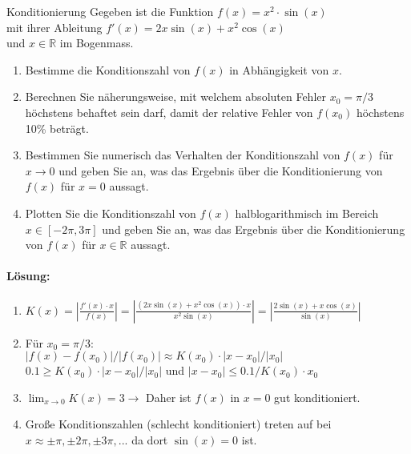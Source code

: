 \begin{example2}{Konditionierung}
Gegeben ist die Funktion
$f(x) = x^2 \cdot \sin(x)$\\
mit ihrer Ableitung
$f'(x) = 2x\sin(x) + x^2\cos(x)$\\
und $x \in \mathbb{R}$ im Bogenmass.
\begin{enumerate}
    \item Bestimme die Konditionszahl von $f(x)$ in Abhängigkeit von $x$.
    \item Berechnen Sie näherungsweise, mit welchem absoluten Fehler $x_0 = \pi/3$ höchstens behaftet sein darf, damit der relative Fehler von $f(x_0)$ höchstens 10\% beträgt.
    \item Bestimmen Sie numerisch das Verhalten der Konditionszahl von $f(x)$ für $x \to 0$ und geben Sie an, was das Ergebnis über die Konditionierung von $f(x)$ für $x = 0$ aussagt.
    \item Plotten Sie die Konditionszahl von $f(x)$ halblogarithmisch im Bereich $x \in [-2\pi, 3\pi]$ und geben Sie an, was das Ergebnis über die Konditionierung von $f(x)$ für $x \in \mathbb{R}$ aussagt.
\end{enumerate}
\paragraph{Lösung:}
\begin{enumerate}
    \item $K(x) = \left|\frac{f'(x)\cdot x}{f(x)}\right| = \left|\frac{(2x\sin(x)+x^2\cos(x))\cdot x}{x^2\sin(x)}\right| = \left|\frac{2\sin(x)+x\cos(x)}{\sin(x)}\right|$
    
    \item Für $x_0 = \pi/3$:\\
    $|f(x)-f(x_0)|/|f(x_0)| \approx K(x_0)\cdot|x-x_0|/|x_0|$\\
    $0.1 \geq K(x_0)\cdot|x-x_0|/|x_0|$ und
    $|x-x_0| \leq 0.1/K(x_0)\cdot x_0$
    
    \item $\lim_{x \to 0} K(x) = 3 \rightarrow$
    Daher ist $f(x)$ in $x=0$ gut konditioniert.
    
    \item Große Konditionszahlen (schlecht konditioniert) treten auf bei $x \approx \pm\pi, \pm2\pi, \pm3\pi,...$ da dort $\sin(x)=0$ ist.
\end{enumerate}
\end{example2}



